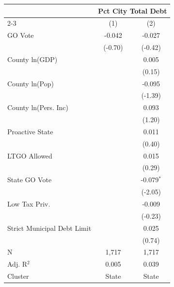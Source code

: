 \begingroup
\centering
\begin{tabular*}{\textwidth}{@{\extracolsep{\fill}}lcc}
   \toprule
    & \multicolumn{2}{c}{Pct City Total Debt}\\
   \cmidrule(lr){2-3}
                               & (1)      & (2)\\  
   \midrule 
   GO Vote                     & -0.042   & -0.027\\   
                               & (-0.70) & (-0.42)\\   
   County ln(GDP)              &          & 0.005\\   
                               &          & (0.15)\\   
   County ln(Pop)              &          & -0.095\\   
                               &          & (-1.39)\\   
   County ln(Pers. Inc)        &          & 0.093\\   
                               &          & (1.20)\\   
   Proactive State             &          & 0.011\\   
                               &          & (0.40)\\   
   LTGO Allowed                &          & 0.015\\   
                               &          & (0.29)\\   
   State GO Vote               &          & -0.079$^{*}$\\   
                               &          & (-2.05)\\   
   Low Tax Priv.               &          & -0.009\\   
                               &          & (-0.23)\\   
   Strict Municipal Debt Limit &          & 0.025\\   
                               &          & (0.74)\\   
   \hline
   N                & 1,717    & 1,717\\  
   Adj. R$^2$              & 0.005    & 0.039\\  
   Cluster              & State & State\\  
   \bottomrule
\end{tabular*}
\par\endgroup
